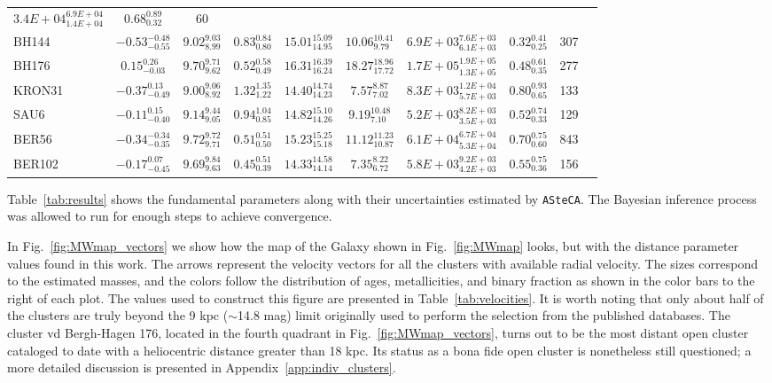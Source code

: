 \documentclass{aa}
\begin{document}
\begin{table}
\begin{tabular}{lccccccccc}
    $3.4E+04_{1.4E+04}^{6.9E+04}$ & $0.68_{0.32}^{0.89}$ & 60 \\[.2cm]
    BH144 & $-0.53_{-0.55}^{-0.48}$ & $9.02_{8.99}^{9.03}$ &
    $0.83_{0.80}^{0.84}$ & $15.01_{14.95}^{15.09}$ & $10.06_{9.79}^{10.41}$ &
    $6.9E+03_{6.1E+03}^{7.6E+03}$ & $0.32_{0.25}^{0.41}$ & 307 \\[.2cm]
    BH176 & $0.15_{-0.03}^{0.26}$ & $9.70_{9.62}^{9.71}$ &
    $0.52_{0.49}^{0.58}$ & $16.31_{16.24}^{16.39}$ & $18.27_{17.72}^{18.96}$ &
    $1.7E+05_{1.3E+05}^{1.9E+05}$ & $0.48_{0.35}^{0.61}$ & 277 \\[.2cm]
    KRON31 & $-0.37_{-0.49}^{0.13}$ & $9.00_{8.92}^{9.06}$ &
    $1.32_{1.22}^{1.35}$ & $14.40_{14.23}^{14.74}$ & $7.57_{7.02}^{8.87}$ &
    $8.3E+03_{5.7E+03}^{1.2E+04}$ & $0.80_{0.65}^{0.93}$ & 133 \\[.2cm]
    SAU6 & $-0.11_{-0.40}^{0.15}$ & $9.14_{9.05}^{9.44}$ &
    $0.94_{0.85}^{1.04}$ & $14.82_{14.26}^{15.10}$ & $9.19_{7.10}^{10.48}$ &
    $5.2E+03_{3.5E+03}^{8.2E+03}$ & $0.52_{0.33}^{0.74}$ & 129 \\[.2cm]
    BER56 & $-0.34_{-0.35}^{-0.34}$ & $9.72_{9.71}^{9.72}$ &
    $0.51_{0.50}^{0.51}$ & $15.23_{15.18}^{15.25}$ & $11.12_{10.87}^{11.23}$ &
    $6.1E+04_{5.3E+04}^{6.7E+04}$ & $0.70_{0.60}^{0.75}$ & 843 \\[.2cm]
    BER102 & $-0.17_{-0.45}^{0.07}$ & $9.69_{9.63}^{9.84}$ &
    $0.45_{0.39}^{0.51}$ & $14.33_{14.14}^{14.58}$ & $7.35_{6.72}^{8.22}$ &
    $5.8E+03_{4.2E+03}^{9.2E+03}$ & $0.55_{0.36}^{0.75}$ & 156 \\[.2cm]
  \hline
  \end{tabular}
  \end{table}


  Table~\ref{tab:results} shows the fundamental parameters along with their
  uncertainties estimated by \texttt{ASteCA}. The Bayesian inference process
  was allowed to run for enough steps to achieve convergence.

  In Fig.~\ref{fig:MWmap_vectors} we show how the map of the Galaxy shown
   in Fig.~\ref{fig:MWmap} looks, but with the distance parameter
  values found in this work. The arrows represent the velocity vectors for all
  the clusters with available radial velocity. The sizes correspond to the estimated
  masses, and the  colors follow the distribution of ages, metallicities, and binary
  fraction as shown in the color bars to the right of each plot. The values used
  to construct this figure are presented in Table~\ref{tab:velocities}.
  It is worth noting that only about half of the clusters are truly beyond the 9
  kpc ($\sim$14.8 mag) limit originally used to perform the selection from the
  published databases.
  The cluster vd Bergh-Hagen 176, located in the fourth quadrant
  in Fig.~\ref{fig:MWmap_vectors}, turns out to be the most distant open cluster
  cataloged to date with a heliocentric distance greater than 18 kpc. Its
  status as a bona fide open cluster is nonetheless still questioned; a more
  detailed discussion is presented in Appendix~\ref{app:indiv_clusters}.
\end{document}
